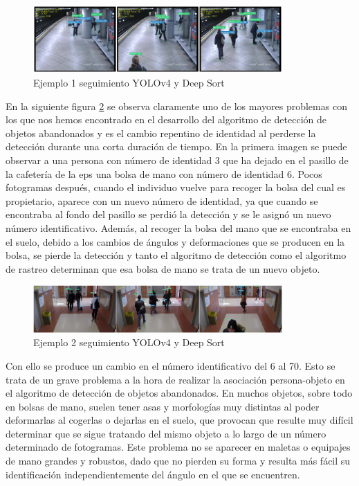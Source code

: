 \begin{figure}[ht]
\centering
\includegraphics[width=0.85\textwidth]{img/chapters/resultados/tracking/avss-tracking-result-example.jpg}
\caption{\label{fig:avss-tracking-example}Ejemplo 1 seguimiento YOLOv4 y Deep Sort \cite{AVSSAB2007-dataset}}
\end{figure}

En la siguiente figura \ref{fig:gba-tracking-example} se observa claramente uno de los mayores problemas con los que nos hemos encontrado en el desarrollo del algoritmo de detección de objetos abandonados y es el cambio repentino de identidad al perderse la detección durante una corta duración de tiempo. En la primera imagen se puede observar a una persona con número de identidad 3 que ha dejado en el pasillo de la cafetería de la \gls{eps} una bolsa de mano con número de identidad 6. Pocos fotogramas después, cuando el individuo vuelve para recoger la bolsa del cual es propietario, aparece con un nuevo número de identidad, ya que cuando se encontraba al fondo del pasillo se perdió la detección y se le asignó un nuevo número identificativo. Además, al recoger la bolsa del mano que se encontraba en el suelo, debido a los cambios de ángulos y deformaciones que se producen en la bolsa, se pierde la detección y tanto el algoritmo de detección como el algoritmo de rastreo determinan que esa bolsa de mano se trata de un nuevo objeto.

\begin{figure}[ht]
\centering
\includegraphics[width=0.85\textwidth]{img/chapters/resultados/tracking/gba-tracking-result-example.jpg}
\caption{\label{fig:gba-tracking-example}Ejemplo 2 seguimiento YOLOv4 y Deep Sort \cite{gba-dataset}}
\end{figure}

Con ello se produce un cambio en el número identificativo del 6 al 70. Esto se trata de un grave problema a la hora de realizar la asociación persona-objeto en el algoritmo de detección de objetos abandonados. En muchos objetos, sobre todo en bolsas de mano, suelen tener asas y morfologías muy distintas al poder deformarlas al cogerlas o dejarlas en el suelo, que provocan que resulte muy difícil determinar que se sigue tratando del mismo objeto a lo largo de un número determinado de fotogramas. Este problema no se aparecer en maletas o equipajes de mano grandes y robustos, dado que no pierden su forma y resulta más fácil su identificación independientemente del ángulo en el que se encuentren.

